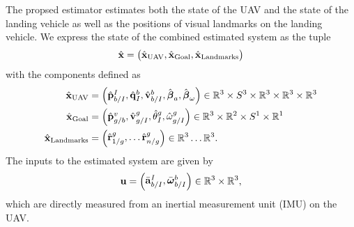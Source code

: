 
The propsed estimator estimates both the state of
the UAV and the state of the landing vehicle as well as the positions of visual
landmarks on the landing vehicle.
We express the state of the combined estimated system as the tuple
\begin{equation*}
  \hat{\boldsymbol{\mathrm{x}}} =
  \begin{pmatrix}
    \hat{\boldsymbol{\mathrm{x}}}_{\text{UAV}}, \hat{\boldsymbol{\mathrm{x}}}_{\text{Goal}}, \hat{\boldsymbol{\mathrm{x}}}_{\text{Landmarks}}
  \end{pmatrix}
\end{equation*}
with the components defined as
\begin{align*}
  \hat{\boldsymbol{\mathrm{x}}}_{\text{UAV}} &=
  \begin{pmatrix}
    \hat{\boldsymbol{\mathrm{p}}}_{b/I}^{I}, \hat{\boldsymbol{\mathrm{q}}}_I^{b}, \hat{\boldsymbol{\mathrm{v}}}_{b/I}^b,
    \hat{\boldsymbol{\mathrm{\beta}}}_a,
    \hat{\boldsymbol{\mathrm{\beta}}}_{\omega}
  \end{pmatrix}
  \in \mathbb{R}^3 \times S^3 \times \mathbb{R}^3 \times \mathbb{R}^3 \times
    \mathbb{R}^3  \\
    \hat{\boldsymbol{\mathrm{x}}}_{\text{Goal}} & =
    \begin{pmatrix}
      \hat{\boldsymbol{\mathrm{p}}}_{g/b}^{v}, \hat{\boldsymbol{\mathrm{v}}}_{g/I}^{g}, \hat{\theta}_{I}^{g},
      \hat{\omega}_{g/I}^{g}
    \end{pmatrix}
    \in \mathbb{R}^3 \times \mathbb{R}^2 \times S^1 \times \mathbb{R}^1
    \\
    \hat{\boldsymbol{\mathrm{x}}}_{\text{Landmarks}} & =
    \begin{pmatrix}
      \hat{\boldsymbol{\mathrm{r}}}_{1/g}^{g}, \dots \hat{\boldsymbol{\mathrm{r}}}_{n/g}^{g}
    \end{pmatrix}
    \in \mathbb{R}^3 \dots \mathbb{R}^3.
\end{align*}
The inputs to the estimated system are given by
\begin{equation*}
  \boldsymbol{\mathrm{u}} = \begin{pmatrix} \bar{\boldsymbol{\mathrm{a}}}_{b/I}^I, \bar{\boldsymbol{\mathrm{\omega}}}_{b/I}^b \end{pmatrix} \in
        \mathbb{R}^3 \times \mathbb{R}^3,
\end{equation*}
which are directly measured from an inertial measurement unit (IMU) on the UAV.

